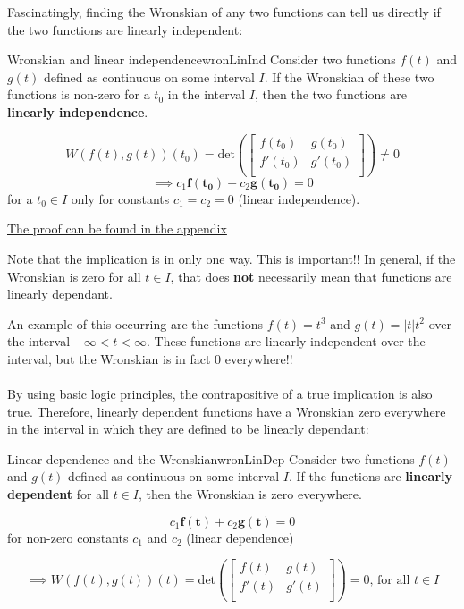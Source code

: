 \documentclass{report}
\begin{document}
Fascinatingly, finding the Wronskian of any two functions can tell us directly if the two functions are linearly independent:

\begin{mytheo}{Wronskian and linear independence}{wronLinInd}
    Consider two functions $f(t)$ and $g(t)$ defined as continuous on some interval $I$. If the Wronskian of these two functions is non-zero for a $t_0$ in the interval $I$, then the two functions are \textbf{linearly independence}. 
    
    $$W(f(t),g(t))(t_0) = \text{det}\left(\begin{bmatrix}
    f(t_0) & g(t_0) \\
    f'(t_0) & g'(t_0) \\
    \end{bmatrix}\right)
    \neq 0 $$
    $$\implies c_1\bm{f(t_0)} + c_2\bm{g(t_0)} = 0$$ 
    for a $t_0 \in I$ only for constants $c_1=c_2=0$ (linear independence).
\end{mytheo}
  
\hyperref[sec:prWronLinInd]{The proof can be found in the appendix}


Note that the implication is in only one way. This is important!! In general, if the Wronskian is zero for all $t \in I$, that does \textbf{not} necessarily mean that functions are linearly dependant. 
    
An example of this occurring are the functions $f(t) = t^3$ and $g(t) = |t|t^2$ over the interval $-\infty < t < \infty$. These functions are linearly independent over the interval, but the Wronskian is in fact 0 everywhere!!
\\ \\
By using basic logic principles, the contrapositive of a true implication is also true. Therefore, linearly dependent functions have a Wronskian zero everywhere in the interval in which they are defined to be linearly dependant:
    
\begin{mytheo}{Linear dependence and the Wronskian}{wronLinDep}
    Consider two functions $f(t)$ and $g(t)$ defined as continuous on some interval $I$. If the functions are \textbf{linearly dependent} for all $t \in I$, then the Wronskian is zero everywhere.
    
    $$c_1\bm{f(t)} + c_2\bm{g(t)} = 0$$ 
    for non-zero constants $c_1$ and $c_2$ (linear dependence)
    
    $$ \implies W(f(t),g(t))(t) = \text{det}\left(\begin{bmatrix}
    f(t) & g(t) \\
    f'(t) & g'(t) \\
    \end{bmatrix}\right)
    = 0 \text{, for all $t \in I$}$$
\end{mytheo}
\end{document}
